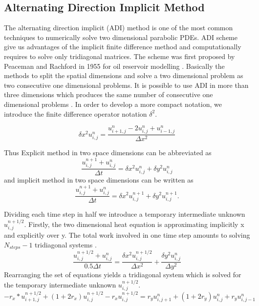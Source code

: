 \documentclass[12pt, oneside]{book}
\theoremstyle{plain}
\theoremstyle{definition}
\begin{document}
\subsection{Alternating Direction Implicit Method}
The alternating direction implicit (ADI) method is one of the most common techniques to numerically solve two dimensional parabolic PDEs. ADI scheme give us advantages of the implicit finite difference method and computationally requires to solve only tridiagonal matrices. The scheme was first proposed by Peaceman and Rachford in 1955 for oil reservoir modelling \cite{peace}. Basically the methods to split the spatial dimensions and solve a two dimensional problem as two consecutive one dimensional problems. It is possible to use ADI in more than three dimensions which produces the same number of consecutive one dimensional problems \cite{DougADI}. In order to develop a more compact notation, we introduce the finite difference operator notation $\delta^2$.

\begin{equation}
\delta x^2 u^{n}_{i,j}  = \frac{u^{n}_{i+1,j} - 2u^{n}_{i,j} + u^{n}_{i-1,j}}{\Delta x^2}
\end{equation}

Thus Explicit method in two space dimensions can be abbreviated as
\begin{equation}
\frac{u^{n+1}_{i,j} + u^{n}_{i,j}}{\Delta t} = \delta x^2 u^{n}_{i,j} + \delta y^2 u^{n}_{i,j}
\end{equation}
and implicit method in two space dimensions can be written as
\begin{equation}
\frac{u^{n+1}_{i,j} + u^{n}_{i,j}}{\Delta t} = \delta x^2 u^{n+1}_{i,j} + \delta y^2 u^{n+1}_{i,j} .
\end{equation}

Dividing each time step in half we introduce a temporary intermediate unknown $u^{n+1/2}_{i,j}$. Firstly, the two dimensional heat equation is approximating implicitly x and explicitly over y. The total work involved in one time step amounts to solving $ N_{steps} - 1$ tridiagonal systems \cite{morton}. 
\begin{equation}
\frac{u^{n+1/2}_{i,j} + u^{n}_{i,j}}{0.5 \Delta t} = \frac{\delta x^2 u^{n+1/2}_{i,j} }{\Delta x^2} + \frac{\delta y^2 u^{n}_{i,j}}{\Delta y^2}
\end{equation}
Rearranging the set of equations yields a tridiagonal system which is solved for the temporary intermediate unknown $u^{n+1/2}_{i,j}$.
\begin{equation}
- r_x * u^{n+1/2}_{i+1,j} + (1 + 2r_x) u^{n+1/2}_{i,j}  - r_x u^{n+1/2}_{i,j}  = r_y u^{n}_{i,j+1} + (1 + 2r_y) u^{n}_{i,j} + r_y u^{n}_{i,j-1}
\end{equation}
\end{document}
